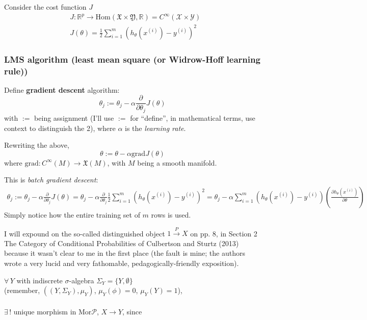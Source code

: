\documentclass[10pt]{amsart}
\begin{document}
\begin{multicols*}{2}
Consider the cost function $J$
\[
\begin{aligned}
  & J:\mathbb{R}^p \to \text{Hom}(\mathfrak{X}\times \mathfrak{Y}, \mathbb{R}) = C^{\infty}(\mathcal{X}\times \mathcal{Y}) \\ 
  & J(\theta) = \frac{1}{2} \sum_{i=1}^m (h_{\theta}(x^{(i)}) - y^{(i)})^2 
\end{aligned}
\]

\subsubsection{LMS algorithm (least mean square (or Widrow-Hoff learning rule))}

Define \textbf{gradient descent} algorithm:
\[
\theta_j := \theta_j- \alpha \frac{ \partial }{ \partial \theta_j} J(\theta)
\]
with $:=$ being assignment (I'll use $:=$ for ``define'', in mathematical terms, use context to distinguish the 2), where $\alpha$ is the \emph{learning rate}.  

Rewriting the above,
\[
\theta := \theta - \alpha \text{grad}J(\theta)
\]
where $\text{grad} : C^{\infty}(M) \to \mathfrak{X}(M)$, with $M$ being a smooth manifold.  

This is \emph{batch gradient descent}:
\[
\begin{gathered}
  \theta_j := \theta_j -\alpha \frac{ \partial }{ \partial \theta_j} J(\theta) = \theta_j - \alpha \frac{ \partial }{ \partial \theta_j} \frac{1}{2} \sum_{i=1}^m ( h_{\theta}(x^{(i)}) - y^{(i)})^2  = \theta_j - \alpha \sum_{i=1}^m (h_{\theta}(x^{(i)}) - y^{(i)} ) \left( \frac{ \partial h_{\theta}(x^{(i)}) }{\partial \theta} \right)
\end{gathered}
\]
Simply notice how the entire training set of $m$ rows is used.  

I will expound on the so-called distinguished object $1\xrightarrow{P}X$ on pp. 8, in Section 2 The Category of Conditional Probabilities of Culbertson and Sturtz (2013) \cite{CS2013} because it wasn't clear to me in the first place (the fault is mine; the authors wrote a very lucid and very fathomable, pedagogically-friendly exposition).  

$\forall \, Y $ with indiscrete $\sigma$-algebra $\Sigma_Y = \lbrace Y ,\emptyset \rbrace$ \\
\phantom{ \qquad \, } (remember, $((Y,\Sigma_Y), \mu_Y)$, $\mu_Y(\phi) = 0$, $\mu_Y(Y)=1$), \\
\qquad \\ 
$\exists \, !$ unique morphism in $\text{Mor}\mathcal{P}$, $X\to Y$, since 


\end{multicols*}
\end{document}
